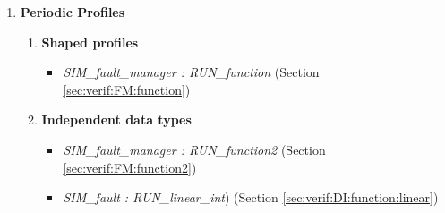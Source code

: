 \documentclass[11pt,fleqn]{report}
\begin{document}
\begin{flushleft}
\begin{enumerate}
\begin{enumerate}
\begin{enumerate}
     \item \textbf{Walk-off}
      \begin{itemize}
       \item \textit{SIM\_fault\_manager : RUN\_function}
         (Section \ref{sec:verif:FM:function:linear}).
       \item \textit{SIM\_fault : RUN\_linear}
         (Section \ref{sec:verif:DI:function:linear})
      \end{itemize}

     \item \textbf{Random-walk}
      \begin{itemize}
       \item \textit{SIM\_fault\_manager : RUN\_random\_walk}
         (Section \ref{sec:verif:FM:randomwalk})
      \end{itemize}

     \item \textbf{Periodic-fluctuation}
      \begin{itemize}
       \item \textit{SIM\_fault\_manager : RUN\_function}
         (Section \ref{sec:verif:FM:function})
      \end{itemize}

     \item \textbf{Initial Fault}
      \begin{itemize}
       \item \textit{SIM\_fault\_manager : RUN\_initial\_bias}
         (Section \ref{sec:verif:FM:initial_fault})
      \end{itemize}
    \end{enumerate}
   \end{enumerate}


   \item \textbf{Periodic Profiles}
    \begin{enumerate}
     \item \textbf{Shaped profiles}
      \begin{itemize}
       \item \textit{SIM\_fault\_manager : RUN\_function}
         (Section \ref{sec:verif:FM:function})
      \end{itemize}

     \item \textbf{Independent data types}
      \begin{itemize}
       \item \textit{SIM\_fault\_manager : RUN\_function2}
         (Section \ref{sec:verif:FM:function2})
       \item \textit{SIM\_fault : RUN\_linear\_int})
         (Section \ref{sec:verif:DI:function:linear})
      \end{itemize}


\end{enumerate}
\end{enumerate}
\end{flushleft}
\end{document}
